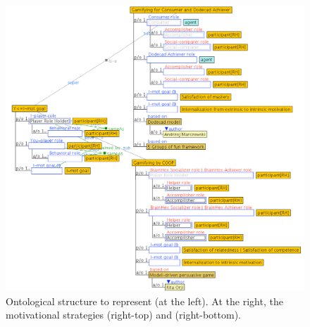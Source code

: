 \begin{figure}[!htbp]
 \caption[Ontological structure to represent individual motivational strategy]{Ontological structure to represent  (at the left). At the right, the motivational strategies  (right-top) and  (right-bottom).}
 \label{fig:ontological-structure-individual-motivational-strategy}
 \centering
 \includegraphics[width=1\textwidth]{images/chap-ontogacles1/ontological-structure-individual-motivational-strategy.png}
 \fautor
\end{figure}

